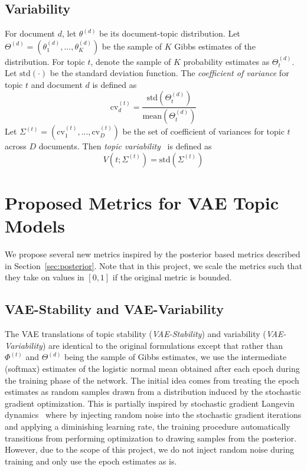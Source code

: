 \documentclass[10pt]{article}
\begin{document}
\subsection{Variability}

For document $d$, let $\theta^{(d)}$ be its document-topic distribution. Let $\Theta^{(d)}=\left(\theta_1^{(d)},...,\theta_K^{(d)}\right)$ be the sample of $K$ Gibbs estimates of the distribution. For topic $t$, denote the sample of $K$ probability estimates as $\Theta_t^{(d)}$. Let $\textrm{std}(\cdot)$ be the standard deviation function. The \textit{coefficient of variance} for topic $t$ and document $d$ is defined as
\[
\textrm{cv}_{d}^{(t)} = \frac{\textrm{std}\left(\Theta_t^{(d)}\right)}{\textrm{mean}\left(\Theta_t^{(d)}\right)}
\]
Let $\Sigma^{(t)}=\left(\textrm{cv}_1^{(t)},...,\textrm{cv}_D^{(t)}\right)$ be the set of coefficient of variances for topic $t$ across $D$ documents. Then \textit{topic variability}~\cite{Xing:2019} is defined as
\[
V\left(t;\Sigma^{(t)}\right) = \textrm{std}\left(\Sigma^{(t)}\right)
\]

\section{Proposed Metrics for VAE Topic Models}

We propose several new metrics inspired by the posterior based metrics described in Section~\ref{sec:posterior}. Note that in this project, we scale the metrics such that they take on values in $[0,1]$ if the original metric is bounded.

\subsection{VAE-Stability and VAE-Variability}

The VAE translations of topic stability (\textit{VAE-Stability}) and variability (\textit{VAE-Variability}) are identical to the original formulations except that rather than $\Phi^{(t)}$ and $\Theta^{(d)}$ being the sample of Gibbs estimates, we use the intermediate (softmax) estimates of the logistic normal mean obtained after each epoch during the training phase of the network. The initial idea comes from treating the epoch estimates as random samples drawn from a distribution induced by the stochastic gradient optimization. This is partially inspired by stochastic gradient Langevin dynamics~\cite{Welling:2011} where by injecting random noise into the stochastic gradient iterations and applying a diminishing learning rate, the training procedure automatically transitions from performing optimization to drawing samples from the posterior. However, due to the scope of this project, we do not inject random noise during training and only use the epoch estimates as is.
\end{document}
